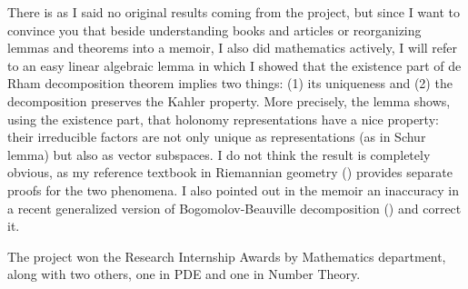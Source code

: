 \documentclass[11pt]{article}
\begin{document}
There is as I said no original results coming from the project, but since I want to
convince you that beside understanding books and articles or reorganizing lemmas and
theorems into a memoir, I also did mathematics actively, I will refer to an easy
linear algebraic lemma in which I showed that the existence part of de Rham decomposition
theorem implies two things: (1) its uniqueness and (2) the decomposition preserves the Kahler property. More precisely, the lemma shows, using the existence part, that holonomy
representations have a nice property: their irreducible factors are not only unique as
representations (as in Schur lemma) but also as vector subspaces. I do not think the
result is completely obvious, as my reference textbook in Riemannian geometry (\cite{sakai_riemannian_1996}) provides separate proofs for the two phenomena. I also pointed out in the
memoir an inaccuracy in a recent generalized version of Bogomolov-Beauville decomposition (\cite{campana_rationally_2012})
and correct it.

The project won the Research Internship Awards by Mathematics department, along with two others, one in PDE and one in Number Theory. 



\end{document}
